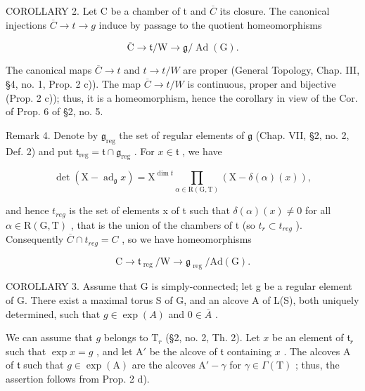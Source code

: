 COROLLARY 2. Let C be a chamber of t and \(\overline{C}\) its closure. The canonical injections \(\overline{C} \rightarrow t \rightarrow g\) induce by passage to the quotient homeomorphisms

\[
\overline {{\mathrm{C}}} \rightarrow \mathfrak {t} / \mathrm{W} \rightarrow \mathfrak {g} / \operatorname{Ad} (\mathrm{G}).
\]

The canonical maps \(\overline{C} \rightarrow t\) and \(t \rightarrow t/W\) are proper (General Topology, Chap. III, §4, no. 1, Prop. 2 c)). The map \(\overline{C} \rightarrow t/W\) is continuous, proper and bijective (Prop. 2 c)); thus, it is a homeomorphism, hence the corollary in view of the Cor. of Prop. 6 of §2, no. 5.

Remark 4. Denote by \(\mathfrak{g}_{\mathrm{reg}}\) the set of regular elements of \(\mathfrak{g}\) (Chap. VII, §2, no. 2, Def. 2) and put \(\mathfrak{t}_{\mathrm{reg}} = \mathfrak{t} \cap \mathfrak{g}_{\mathrm{reg}}\) . For \(x \in \mathfrak{t}\) , we have

\[
\det (\mathrm{X} - \operatorname{ad} _ {\mathfrak {g}} x) = \mathrm{X} ^ {\dim t} \prod_ {\alpha \in \mathrm{R(G,T)}} (\mathrm{X} - \delta (\alpha) (x)),
\]

and hence \(t_{reg}\) is the set of elements x of t such that \(\delta(\alpha)(x) \neq 0\) for all \(\alpha \in \mathrm{R}(\mathrm{G}, \mathrm{T})\) , that is the union of the chambers of t (so \(t_r \subset t_{reg}\) ). Consequently \(\overline{C} \cap t_{reg} = C\) , so we have homeomorphisms

\[
\mathrm{C} \rightarrow \mathfrak {t} _ {\text { reg }} / \mathrm{W} \rightarrow \mathfrak {g} _ {\text { reg }} / \mathrm{Ad} (\mathrm{G}).
\]

COROLLARY 3. Assume that G is simply-connected; let g be a regular element of G. There exist a maximal torus S of G, and an alcove A of L(S), both uniquely determined, such that \(g \in \exp(A)\) and \(0 \in \overline{A}\) .

We can assume that \(g\) belongs to \(\mathrm{T}_r\) (§2, no. 2, Th. 2). Let \(x\) be an element of \(\mathfrak{t}_r\) such that \(\exp x = g\) , and let \(\mathrm{A}'\) be the alcove of \(\mathfrak{t}\) containing \(x\) . The alcoves \(\mathrm{A}\) of \(\mathfrak{t}\) such that \(g \in \exp(\mathrm{A})\) are the alcoves \(\mathrm{A}' - \gamma\) for \(\gamma \in \Gamma(\mathrm{T})\) ; thus, the assertion follows from Prop. 2 d).

